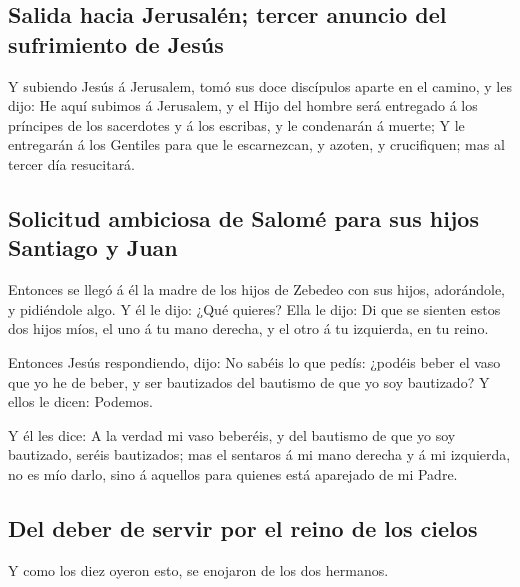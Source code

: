 \hypertarget{salida-hacia-jerusaluxe9n-tercer-anuncio-del-sufrimiento-de-jesuxfas}{%
\subsection{Salida hacia Jerusalén; tercer anuncio del sufrimiento de
Jesús}\label{salida-hacia-jerusaluxe9n-tercer-anuncio-del-sufrimiento-de-jesuxfas}}

 Y subiendo Jesús á Jerusalem, tomó sus doce discípulos
aparte en el camino, y les dijo:  He aquí subimos á
Jerusalem, y el Hijo del hombre será entregado á los príncipes de los
sacerdotes y á los escribas, y le condenarán á muerte;  Y
le entregarán á los Gentiles para que le escarnezcan, y azoten, y
crucifiquen; mas al tercer día resucitará.

\hypertarget{solicitud-ambiciosa-de-salomuxe9-para-sus-hijos-santiago-y-juan}{%
\subsection{Solicitud ambiciosa de Salomé para sus hijos Santiago y
Juan}\label{solicitud-ambiciosa-de-salomuxe9-para-sus-hijos-santiago-y-juan}}

 Entonces se llegó á él la madre de los hijos de Zebedeo
con sus hijos, adorándole, y pidiéndole algo.  Y él le
dijo: ¿Qué quieres? Ella le dijo: Di que se sienten estos dos hijos
míos, el uno á tu mano derecha, y el otro á tu izquierda, en tu reino.

 Entonces Jesús respondiendo, dijo: No sabéis lo que
pedís: ¿podéis beber el vaso que yo he de beber, y ser bautizados del
bautismo de que yo soy bautizado? Y ellos le dicen: Podemos.

 Y él les dice: A la verdad mi vaso beberéis, y del
bautismo de que yo soy bautizado, seréis bautizados; mas el sentaros á
mi mano derecha y á mi izquierda, no es mío darlo, sino á aquellos para
quienes está aparejado de mi Padre.

\hypertarget{del-deber-de-servir-por-el-reino-de-los-cielos}{%
\subsection{Del deber de servir por el reino de los
cielos}\label{del-deber-de-servir-por-el-reino-de-los-cielos}}

 Y como los diez oyeron esto, se enojaron de los dos
hermanos.

